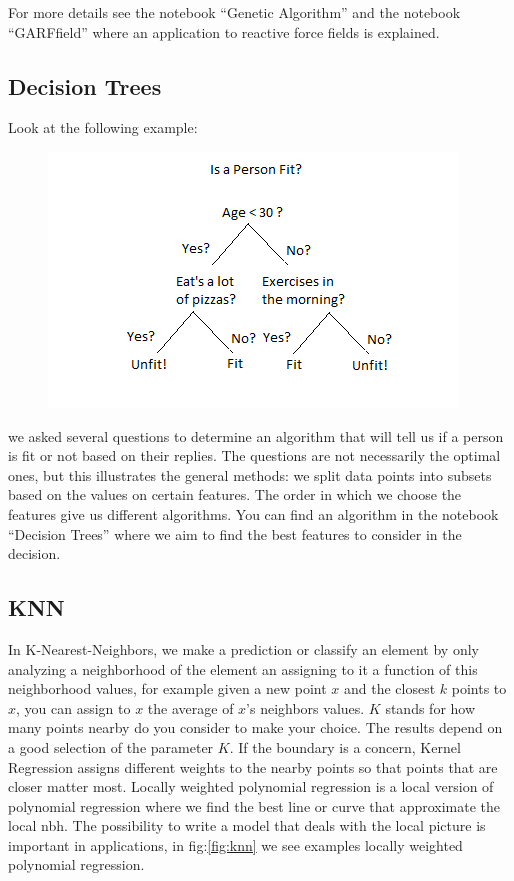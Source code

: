 \documentclass[11pt,letterpaper]{report}
\begin{document}
		
For more details see the notebook ``Genetic Algorithm'' and the notebook ``GARFfield'' where an application to reactive force fields is explained.
 
	 \subsection{Decision Trees}
 
Look at the following example: 
 \begin{figure}[h!]
 	\centering
 	\includegraphics[width=0.45\linewidth]{figures/Decision-Trees.png}
 	\caption{}
 	\label{fig:Trees}
 \end{figure} 	
 
 we asked several questions to determine an algorithm that will tell us if a person is fit or not based on their replies. The questions are not necessarily the optimal ones, but this illustrates the general methods:  we split data points into subsets based on the values on certain features. The order in which we choose the features give us different algorithms. You can find an algorithm in the notebook ``Decision Trees'' where we aim to find the best features to consider in the decision.


 \subsection{KNN}
 In K-Nearest-Neighbors, we make a prediction or classify an element by  only analyzing  a neighborhood of the element an assigning to it a function of this neighborhood values, for example  given a new point $x$ and the closest $k$ points to $x$, you can assign to $x$ the average of $x$'s neighbors values.
 $K$ stands for how many points nearby do you consider to make your choice. The results depend on a good selection of the parameter $K$.  If the boundary is a concern,  Kernel Regression assigns different weights to the nearby points so that points that are closer matter most. Locally weighted polynomial  regression is a local version of polynomial regression where we find the best line or curve that approximate the local nbh.
  The possibility to write a model that deals with the local picture is important in applications, in fig:\ref{fig:knn} we see examples locally weighted polynomial regression.
 
\end{document}
